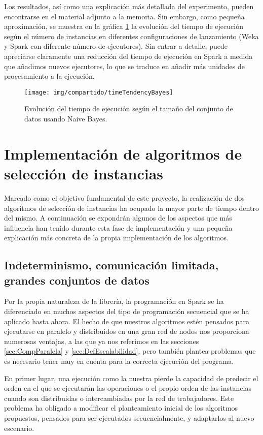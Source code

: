 Los resultados, así como una explicación más detallada del experimento, pueden encontrarse en el material adjunto a la memoria. Sin embargo, como pequeña aproximación, se muestra en la gráfica \ref{fig:img/compartido/timeTendencyBayes} la evolución del tiempo de ejecución según el número de instancias en diferentes configuraciones de lanzamiento (Weka y Spark con diferente número de ejecutores). Sin entrar a detalle, puede apreciarse claramente una reducción del tiempo de ejecución en Spark a medida que añadimos nuevos ejecutores, lo que se traduce en añadir más unidades de procesamiento a la ejecución. 

	\begin{figure}[!h]
		\centering
		\texttt{[image: img/compartido/timeTendencyBayes]}
		\caption{Evolución del tiempo de ejecución según el tamaño del conjunto de datos usando Naive Bayes.}\label{fig:img/compartido/timeTendencyBayes}
	\end{figure}

\section{Implementación de algoritmos de selección de instancias}

Marcado como el objetivo fundamental de este proyecto, la realización de dos algoritmos de selección de instancias ha ocupado la mayor parte de tiempo dentro del mismo. A continuación se expondrán algunos de los aspectos que más influencia han tenido durante esta fase de implementación y una pequeña explicación más concreta de la propia implementación de los algoritmos.


\subsection{Indeterminismo, comunicación limitada, grandes conjuntos de datos}

Por la propia naturaleza de la librería, la programación en Spark se ha diferenciado en muchos aspectos del tipo de programación secuencial que se ha aplicado hasta ahora. El hecho de que nuestros algoritmos estén pensados para ejecutarse en paralelo y distribuidos en una gran red de nodos nos proporciona numerosas ventajas, a las que ya nos referimos en las secciones \ref{sec:CompParalela} y \ref{sec:DefEscalabilidad}, pero también plantea problemas que es necesario tener muy en cuenta para la correcta ejecución del programa.

En primer lugar, una ejecución como la nuestra pierde la capacidad de predecir el orden en el que se ejecutarán las operaciones o el propio orden de las instancias cuando son distribuidas o intercambiadas por la red de trabajadores. Este problema ha obligado a modificar el planteamiento inicial de los algoritmos propuestos, pensados para ser ejecutados secuencialmente, y adaptarlos al nuevo escenario.

